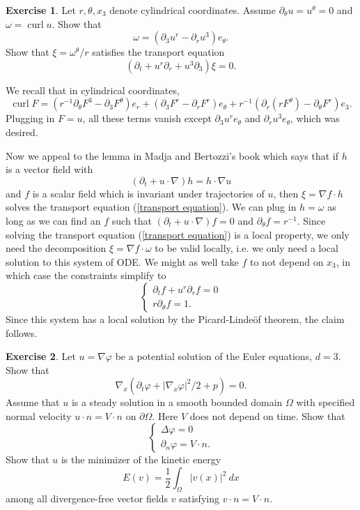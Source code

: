 \documentclass[10pt]{article}
\DeclareMathOperator{\curl}{curl}
\theoremstyle{definition}
\newtheorem{exer}{Exercise}
\begin{document}
\begin{exer}
Let $r,\theta,x_3$ denote cylindrical coordinates.
Assume $\partial_\theta u = u^\theta = 0$ and $\omega = \curl u$. Show that
$$\omega = (\partial_3 u^r - \partial_r u^3) e_\theta.$$
Show that $\xi = \omega^\theta/r$ satisfies the transport equation
\begin{equation}
\label{transport equation}
(\partial_t + u^r \partial_r + u^3\partial_3) \xi = 0.
\end{equation}
\end{exer}

We recall that in cylindrical coordinates,
$$\curl F = (r^{-1}\partial_\theta F^3 - \partial_3 F^\theta)e_r + (\partial_3 F^r - \partial_r F^r)e_\theta + r^{-1}(\partial_r(rF^\theta) - \partial_\theta F^r)e_3.$$
Plugging in $F = u$, all these terms vanish except $\partial_3 u^r e_\theta$ and $\partial_r u^3 e_\theta$, which was desired.

Now we appeal to the lemma in Madja and Bertozzi's book which says that if $h$ is a vector field with
$$(\partial_t + u \cdot \nabla)h = h \cdot \nabla u$$
and $f$ is a scalar field which is invariant under trajectories of $u$, then $\xi = \nabla f \cdot h$ solves the transport equation (\ref{transport equation}).
We can plug in $h = \omega$ as long as we can find an $f$ such that $(\partial_t + u \cdot \nabla)f = 0$ and $\partial_\theta f = r^{-1}$.
Since solving the transport equation (\ref{transport equation}) is a local property, we only need the decomposition $\xi = \nabla f \cdot \omega$ to be valid locally, i.e. we only need a local solution to this system of ODE.
We might as well take $f$ to not depend on $x_3$, in which case the constraints simplify to
$$\begin{cases}
\partial_tf + u^r \partial_r f = 0\\
r\partial_\theta f = 1.
\end{cases}$$
Since this system has a local solution by the Picard-Linde\"of theorem, the claim follows.

\begin{exer}
Let $u = \nabla \varphi$ be a potential solution of the Euler equations, $d = 3$. Show that
$$\nabla_x(\partial_t\varphi + |\nabla_x\varphi|^2/2 + p) = 0.$$
Assume that $u$ is a steady solution in a smooth bounded domain $\Omega$ with specified normal velocity $u \cdot n = V \cdot n$ on $\partial \Omega$.
Here $V$ does not depend on time.
Show that
\begin{equation}
\label{Neumann problem}
\begin{cases}
\Delta \varphi = 0\\
\partial_n \varphi = V \cdot n.
\end{cases}\end{equation}
Show that $u$ is the minimizer of the kinetic energy
$$E(v) = \frac{1}{2} \int_\Omega |v(x)|^2 ~dx$$
among all divergence-free vector fields $v$ satisfying $v \cdot n = V \cdot n$.
\end{exer}
\end{document}
